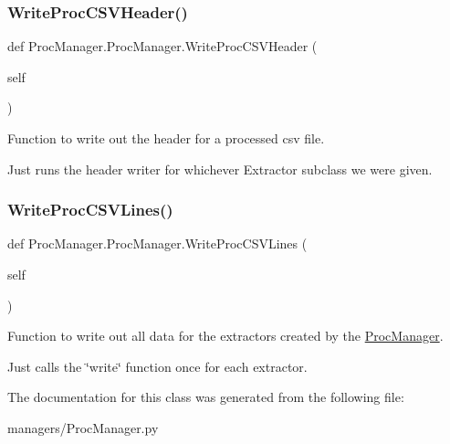 \subsubsection{\texorpdfstring{WriteProcCSVHeader()}{WriteProcCSVHeader()}}
{\footnotesize\ttfamily def Proc\+Manager.\+Proc\+Manager.\+Write\+Proc\+C\+S\+V\+Header (\begin{DoxyParamCaption}\item[{}]{self }\end{DoxyParamCaption})}



Function to write out the header for a processed csv file. 

Just runs the header writer for whichever Extractor subclass we were given. \mbox{\label{class_proc_manager_1_1_proc_manager_aed7e5345016adee275b0e3415b420b66}} 
\subsubsection{\texorpdfstring{WriteProcCSVLines()}{WriteProcCSVLines()}}
{\footnotesize\ttfamily def Proc\+Manager.\+Proc\+Manager.\+Write\+Proc\+C\+S\+V\+Lines (\begin{DoxyParamCaption}\item[{}]{self }\end{DoxyParamCaption})}



Function to write out all data for the extractors created by the \mbox{\hyperlink{class_proc_manager_1_1_proc_manager}{Proc\+Manager}}. 

Just calls the \char`\"{}write\char`\"{} function once for each extractor. 

The documentation for this class was generated from the following file\+:\begin{DoxyCompactItemize}
\item 
managers/Proc\+Manager.\+py\end{DoxyCompactItemize}
